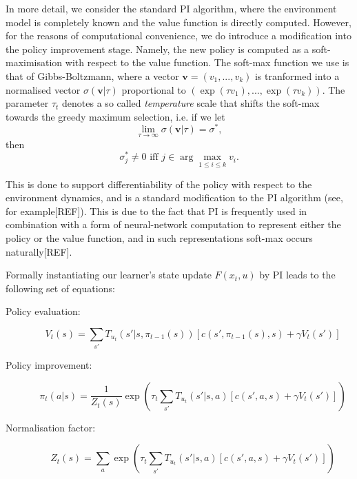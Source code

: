 In more detail, we consider the standard PI algorithm, where the
environment model is completely known and the value function is
directly computed. However, for the reasons of computational
convenience, we do introduce a modification into the policy
improvement stage. Namely, the new policy is computed as a
soft-maximisation with respect to the value function. The soft-max
function we use is that of Gibbs-Boltzmann, where a vector
$\mathbf{v}=(v_1,...,v_k)$ is tranformed into a normalised vector
$\sigma(\mathbf{v}|\tau)$ proportional to $(\exp(\tau
v_1),...,\exp(\tau v_k))$. The parameter $\tau_t$ denotes a so called
{\em temperature} scale that shifts the soft-max towards the greedy
maximum selection, i.e. if we let
\[
\lim\limits_{\tau\rightarrow\infty}\sigma(\mathbf{v}|\tau)=\sigma^*,
\]
then 
\[\sigma^*_j\neq 0 \mbox{ iff } j\in\arg\max\limits_{1\leq i\leq k}v_i.\]

This is done to support differentiability of the policy with respect
to the environment dynamics, and is a standard modification to the PI algorithm (see, for example[REF]).   
This is due to the fact that PI is frequently used in
combination with a form of neural-network computation to represent
either the policy or the value function, and in such representations
soft-max occurs naturally[REF].

Formally instantiating our learner's state update $F(x_t,u)$ by PI
leads to the following set of equations: %
\begin{description}
\item[Policy evaluation:]
  \[V_t(s)=\sum\limits_{s'}T_{u_t}(s'|s,\pi_{t-1}(s))\left[
    c(s',\pi_{t-1}(s),s)+\gamma V_t(s')
    \right]\]

\item[Policy improvement:]
\[\pi_t(a|s)=\frac{1}{Z_t(s)}\exp\left(\tau_t\sum\limits_{s'}T_{u_t}(s'|s,a)\left[
    c(s',a,s)+\gamma V_t(s')
    \right]\right) \]
    
\item[Normalisation factor:]
\[Z_t(s)=\sum\limits_a\exp\left(\tau_t\sum\limits_{s'}T_{u_t}(s'|s,a)\left[
    c(s',a,s)+\gamma V_t(s') \right]\right)\]
\end{description}
    

